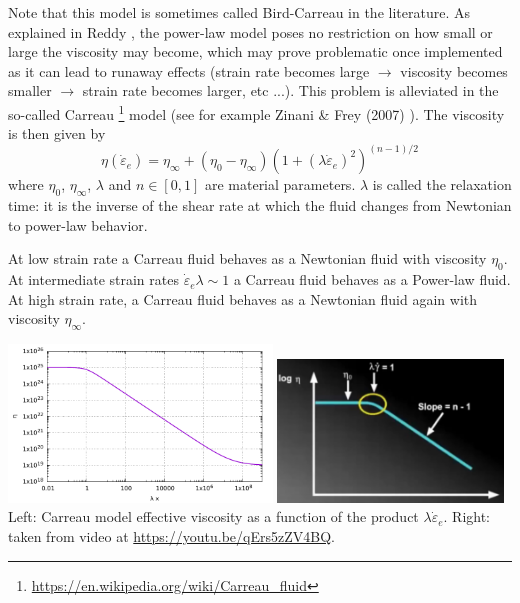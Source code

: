 Note that this model is sometimes called Bird-Carreau in the literature. 
As explained in Reddy \cite{reddybook2}, the power-law model poses no restriction on 
how small or large the viscosity may become, which may prove problematic once 
implemented as it can lead to runaway effects (strain rate becomes large $\rightarrow$
viscosity becomes smaller $\rightarrow$ strain rate becomes larger, etc ...).
This problem is alleviated in the so-called Carreau
\footnote{\url{https://en.wikipedia.org/wiki/Carreau_fluid}} model \cite{carr72} 
(see for example Zinani \& Frey (2007) \cite{zifr07}). 
The viscosity is then given by
\begin{equation}
\eta(\dot{\varepsilon}_{e}) = \eta_\infty + (\eta_0-\eta_\infty) \left(1 + (\lambda \dot{\varepsilon}_{e})^2 \right)^{(n-1)/2}
\end{equation}
where $\eta_0$, $\eta_\infty$, $\lambda$ and $n\in[0,1]$ are material parameters. 
$\lambda$ is called the relaxation time: it is the inverse of the shear rate at which 
the fluid changes from Newtonian to power-law behavior.

At low strain rate a Carreau fluid behaves as a Newtonian fluid with viscosity $\eta_0$.
At intermediate strain rates $\dot{\varepsilon}_{e} \lambda \sim 1$ a Carreau fluid behaves 
as a Power-law fluid. At high strain rate, a Carreau fluid behaves as a Newtonian fluid 
again with viscosity $\eta_\infty$.
 
\begin{center}
\includegraphics[width=7cm]{images/rheology/carreau/carreau.pdf}
\includegraphics[width=6cm]{images/rheology/carreau/carreau1}\\
{\captionfont Left: Carreau model effective viscosity as a function of 
the product $\lambda \dot{\varepsilon}_{e}$. Right: taken from 
video at \url{https://youtu.be/qErs5zZV4BQ}.}
\end{center}

